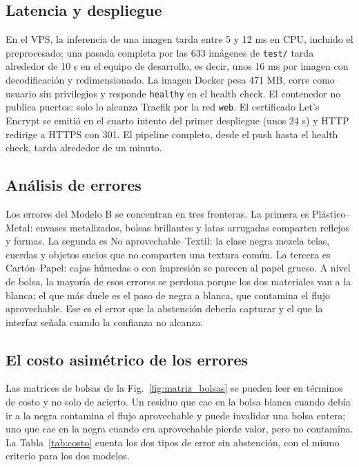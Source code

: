 \documentclass[10pt]{ieeeconf}
\begin{document}
\subsection{Latencia y despliegue}

En el VPS, la inferencia de una imagen tarda entre 5 y 12 ms en CPU, incluido el
preprocesado; una pasada completa por las 633 im\'agenes de \texttt{test/} tarda
alrededor de 10 s en el equipo de desarrollo, es decir, unos 16 ms por imagen con
decodificaci\'on y redimensionado. La imagen Docker pesa 471 MB, corre como
usuario sin privilegios y responde \texttt{healthy} en el health check. El
contenedor no publica puertos: solo lo alcanza Traefik por la red \texttt{web}. El
certificado Let's Encrypt se emiti\'o en el cuarto intento del primer despliegue
(unos 24 s) y HTTP redirige a HTTPS con 301. El pipeline completo, desde el push
hasta el health check, tarda alrededor de un minuto.

\subsection{An\'alisis de errores}

Los errores del Modelo B se concentran en tres fronteras. La primera es
Pl\'astico--Metal: envases metalizados, bolsas brillantes y latas arrugadas
comparten reflejos y formas. La segunda es No aprovechable--Textil: la clase
negra mezcla telas, cuerdas y objetos sucios que no comparten una textura com\'un.
La tercera es Cart\'on--Papel: cajas h\'umedas o con impresi\'on se parecen al
papel grueso. A nivel de bolsa, la mayor\'ia de esos errores se perdona porque los
dos materiales van a la blanca; el que m\'as duele es el paso de negra a blanca,
que contamina el flujo aprovechable. Ese es el error que la abstenci\'on deber\'ia
capturar y el que la interfaz se\~nala cuando la confianza no alcanza.

\subsection{El costo asim\'etrico de los errores}
\label{sec:costo}

Las matrices de bolsas de la Fig.~\ref{fig:matriz_bolsas} se pueden leer en
t\'erminos de costo y no solo de acierto. Un residuo que cae en la bolsa blanca
cuando deb\'ia ir a la negra contamina el flujo aprovechable y puede invalidar una
bolsa entera; uno que cae en la negra cuando era aprovechable pierde valor, pero
no contamina. La Tabla~\ref{tab:costo} cuenta los dos tipos de error sin
abstenci\'on, con el mismo criterio para los dos modelos.
\end{document}
